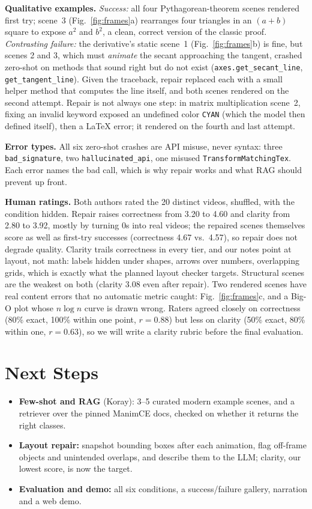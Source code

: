 \documentclass[11pt]{article}
\begin{document}
\textbf{Qualitative examples.} \emph{Success:} all four Pythagorean-theorem scenes rendered first try; scene~3 (Fig.~\ref{fig:frames}a) rearranges four triangles in an $(a+b)$ square to expose $a^2$ and $b^2$, a clean, correct version of the classic proof. \emph{Contrasting failure:} the derivative's static scene~1 (Fig.~\ref{fig:frames}b) is fine, but scenes 2 and 3, which must \emph{animate} the secant approaching the tangent, crashed zero-shot on methods that sound right but do not exist (\texttt{axes.get\_secant\_line}, \texttt{get\_tangent\_line}). Given the traceback, repair replaced each with a small helper method that computes the line itself, and both scenes rendered on the second attempt. Repair is not always one step: in matrix multiplication scene~2, fixing an invalid keyword exposed an undefined color \texttt{CYAN} (which the model then defined itself), then a LaTeX error; it rendered on the fourth and last attempt.

\textbf{Error types.} All six zero-shot crashes are API misuse, never syntax: three \texttt{bad\_signature}, two \texttt{hallucinated\_api}, one misused \texttt{TransformMatchingTex}. Each error names the bad call, which is why repair works and what RAG should prevent up front.

\textbf{Human ratings.} Both authors rated the 20 distinct videos, shuffled, with the condition hidden. Repair raises correctness from 3.20 to 4.60 and clarity from 2.80 to 3.92, mostly by turning 0s into real videos; the repaired scenes themselves score as well as first-try successes (correctness 4.67 vs.\ 4.57), so repair does not degrade quality. Clarity trails correctness in every tier, and our notes point at layout, not math: labels hidden under shapes, arrows over numbers, overlapping grids, which is exactly what the planned layout checker targets. Structural scenes are the weakest on both (clarity 3.08 even after repair). Two rendered scenes have real content errors that no automatic metric caught: Fig.~\ref{fig:frames}c, and a Big-O plot whose $n\log n$ curve is drawn wrong. Raters agreed closely on correctness (80\% exact, 100\% within one point, $r=0.88$) but less on clarity (50\% exact, 80\% within one, $r=0.63$), so we will write a clarity rubric before the final evaluation.

\section{Next Steps}

\begin{itemize}
  \item \textbf{Few-shot and RAG} (Koray): 3--5 curated modern example scenes, and a retriever over the pinned ManimCE docs, checked on whether it returns the right classes.
  \item \textbf{Layout repair:} snapshot bounding boxes after each animation, flag off-frame objects and unintended overlaps, and describe them to the LLM; clarity, our lowest score, is now the target.
  \item \textbf{Evaluation and demo:} all six conditions, a success/failure gallery, narration and a web demo.
\end{itemize}
\end{document}
